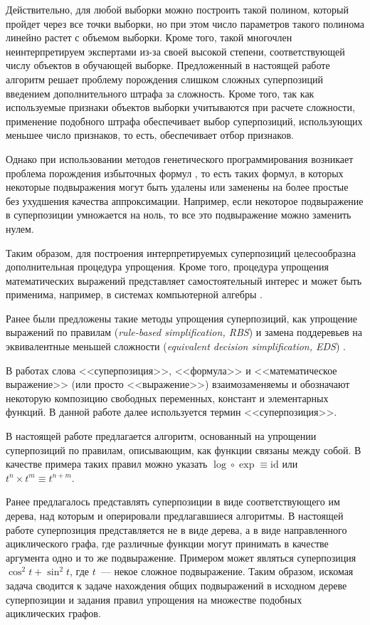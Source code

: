 \documentclass[12pt,a4paper]{article}
\begin{document}
Действительно, для любой выборки можно построить такой полином, который пройдет через
все точки выборки, но при этом число параметров такого полинома линейно
растет с объемом выборки. Кроме того, такой многочлен неинтерпретируем
экспертами из-за своей высокой степени, соответствующей числу объектов в обучающей
выборке. Предложенный в настоящей работе алгоритм решает проблему
порождения слишком сложных суперпозиций введением дополнительного штрафа
за сложность. Кроме того, так как используемые признаки объектов выборки
учитываются при расчете сложности, применение подобного штрафа обеспечивает
выбор суперпозиций, использующих меньшее число признаков, то есть, обеспечивает
отбор признаков.

Однако при использовании методов генетического программирования возникает
проблема порождения избыточных формул \cite{Soule97,Soule98,Streeter03}, то
есть таких формул, в которых некоторые подвыражения могут быть удалены или
заменены на более простые без ухудшения качества аппроксимации. Например,
если некоторое подвыражение в суперпозиции умножается на ноль, то все это
подвыражение можно заменить нулем.

Таким образом, для построения интерпретируемых суперпозиций целесообразна
дополнительная процедура упрощения.
Кроме того, процедура упрощения математических выражений представляет
самостоятельный интерес и может быть применима, например, в системах компьютерной
алгебры \cite{Carette04}.

Ранее были предложены такие методы упрощения суперпозиций, как упрощение
выражений по правилам (\emph{rule-based simplification, RBS}) \cite{Ehrig2006,EhrigHandbook}
и замена поддеревьев на эквивалентные меньшей сложности (\emph{equivalent
decision simplification, EDS}) \cite{MoriSimpl}.

В работах \cite{Ehrig2006,EhrigHandbook,MoriSimpl} слова
<<суперпозиция>>, <<формула>> и <<математическое выражение>>
(или просто <<выражение>>) взаимозаменяемы и обозначают некоторую композицию
свободных переменных, констант и элементарных функций. В данной работе далее используется
термин <<суперпозиция>>.

В настоящей работе предлагается алгоритм, основанный на упрощении суперпозиций по
правилам, описывающим, как функции связаны между собой. В качестве примера таких правил
можно указать $\log \circ \exp \equiv \text{id}$ или $t^n \times t^m \equiv t^{n+m}$.

Ранее предлагалось \cite{Sasaki86,Soule98,Carette04,Stoutemyer11,Stoutemyer12} представлять
суперпозиции в виде соответствующего им дерева, над которым и оперировали предлагавшиеся
алгоритмы. В настоящей работе суперпозиция представляется не в виде дерева, а в виде
направленного ациклического графа, где различные функции могут принимать в
качестве аргумента одно и то же подвыражение. Примером может являться суперпозиция
$\cos^2 t + \sin^2 t$, где $t$~--- некое сложное подвыражение. Таким образом,
искомая задача сводится к задаче нахождения общих подвыражений в исходном
дереве суперпозиции и задания правил упрощения на множестве подобных
ациклических графов.
\end{document}
